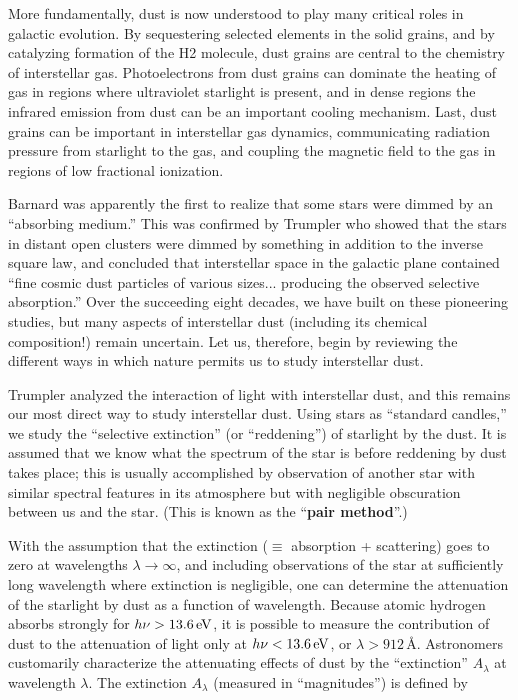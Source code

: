 \documentclass[a4paper,10pt]{article}
\begin{document}
{\noindent}More fundamentally, dust is now understood to play many critical roles in galactic evolution. By sequestering selected elements in the solid grains, and by catalyzing formation of the H2 molecule, dust grains are central to the chemistry of interstellar gas. Photoelectrons from dust grains can dominate the heating of gas in regions where ultraviolet starlight is present, and in dense regions the infrared emission from dust can be an important cooling mechanism. Last, dust grains can be important in interstellar gas dynamics, communicating radiation pressure from starlight to the gas, and coupling the magnetic field to the gas in regions of low fractional ionization.

{\noindent}Barnard was apparently the first to realize that some stars were dimmed by an “absorbing medium.” This was confirmed by Trumpler who showed that the stars in distant open clusters were dimmed by something in addition to the inverse square law, and concluded that interstellar space in the galactic plane contained ``fine cosmic dust particles of various sizes... producing the observed selective absorption.'' Over the succeeding eight decades, we have built on these pioneering studies, but many aspects of interstellar dust (including its chemical composition!) remain uncertain. Let us, therefore, begin by reviewing the different ways in which nature permits us to study interstellar dust.

{\noindent}Trumpler analyzed the interaction of light with interstellar dust, and this remains our most direct way to study interstellar dust. Using stars as ``standard candles,'' we study the ``selective extinction'' (or “reddening'') of starlight by the dust. It is assumed that we know what the spectrum of the star is before reddening by dust takes place; this is usually accomplished by observation of another star with similar spectral features in its atmosphere but with negligible obscuration between us and the star. (This is known as the ``\textbf{pair method}''.)

{\noindent}With the assumption that the extinction ($\equiv$ absorption + scattering) goes to zero at wavelengths $\lambda\rightarrow\infty$, and including observations of the star at sufficiently long wavelength where extinction is negligible, one can determine the attenuation of the starlight by dust as a function of wavelength. Because atomic hydrogen absorbs strongly for $h\nu>13.6\,{\rm eV}$, it is possible to measure the contribution of dust to the attenuation of light only at $h\nu<13.6\,{\rm eV}$, or $\lambda>912$\,\AA. Astronomers customarily characterize the attenuating effects of dust by the ``extinction'' $A_\lambda$ at wavelength $\lambda$. The extinction $A_\lambda$ (measured in ``magnitudes'') is defined by
\end{document}
